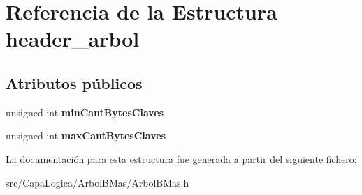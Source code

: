 \hypertarget{structheader__arbol}{\section{\-Referencia de la \-Estructura header\-\_\-arbol}
\label{structheader__arbol}
}
\subsection*{\-Atributos públicos}
\begin{DoxyCompactItemize}
\item 
\hypertarget{structheader__arbol_aa7ab070301a4806642b3e6284e9e2adc}{unsigned int {\bfseries min\-Cant\-Bytes\-Claves}}\label{structheader__arbol_aa7ab070301a4806642b3e6284e9e2adc}

\item 
\hypertarget{structheader__arbol_af823687bd7171a6db89fde397aaa2e58}{unsigned int {\bfseries max\-Cant\-Bytes\-Claves}}\label{structheader__arbol_af823687bd7171a6db89fde397aaa2e58}

\end{DoxyCompactItemize}


\-La documentación para esta estructura fue generada a partir del siguiente fichero\-:\begin{DoxyCompactItemize}
\item 
src/\-Capa\-Logica/\-Arbol\-B\-Mas/\-Arbol\-B\-Mas.\-h\end{DoxyCompactItemize}
